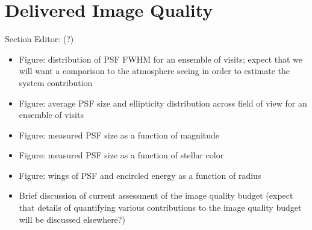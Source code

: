 \section{Delivered Image Quality}
\label{sec:image_quality}

Section Editor: (?)

\begin{itemize}
    \item Figure: distribution of PSF FWHM for an ensemble of visits; expect that we will want a comparison to the atmosphere seeing in order to estimate the system contribution
    \item Figure: average PSF size and ellipticity distribution across field of view for an ensemble of visits
    \item Figure: measured PSF size as a function of magnitude
    \item Figure: measured PSF size as a function of stellar color
    \item Figure: wings of PSF and encircled energy as a function of radius
    \item Brief discussion of current assessment of the image quality budget (expect that details of quantifying various contributions to the image quality budget will be discussed elsewhere?)
\end{itemize}